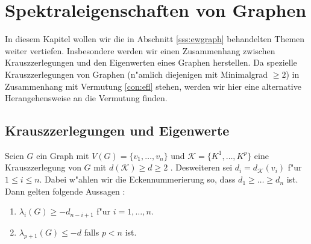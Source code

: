 \section{Spektraleigenschaften von Graphen}

In diesem Kapitel wollen wir die in Abschnitt \ref{sss:ewgraph} behandelten Themen weiter vertiefen. Insbesondere werden wir einen Zusammenhang zwischen Krauszzerlegungen und den Eigenwerten eines Graphen herstellen. Da spezielle Krauszzerlegungen von Graphen (n"amlich diejenigen mit Minimalgrad $\geq 2$) in Zusammenhang mit Vermutung \ref{con:efl} stehen, werden wir hier eine alternative Herangehensweise an die Vermutung finden. 

\subsection{Krauszzerlegungen und Eigenwerte}
\begin{theorem}
  \label{thm:KrauszEigenwerte}
  Seien $G$ ein Graph mit $V(G)=\{v_1,\dots,v_n\}$ und $\mathcal K=\{K^1,\dots,K^p\}$ eine Krauszzerlegung von $G$ mit $d(\mathcal K) \geq d \geq 2$ . Desweiteren sei $d_i = d_{\mathcal{K}}(v_{i})$ f"ur $1\leq i \leq n$. 
  Dabei w"ahlen wir die Eckennummerierung so, dass $d_1 \geq \dots \geq d_{n}$ ist.
  Dann gelten folgende Aussagen : 
  \begin{enumerate}[label=\rm{(\alph*)}]
    \item $\lambda_i(G) \geq -d_{n-i+1}$ f"ur $i = 1, \dots , n$.
    \item $\lambda_{p+1}(G) \leq -d$ falls $p < n$ ist.
  \end{enumerate}
\end{theorem}
